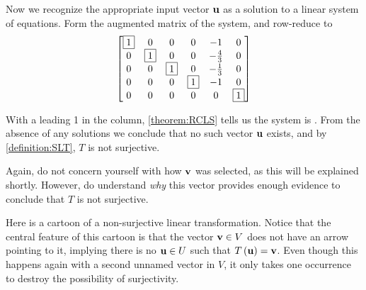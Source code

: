 \documentclass{ximera}
\begin{document}
\begin{example}
Now we recognize the appropriate input vector $\mathbf{u}$ as a solution to a linear system of equations.  Form the augmented matrix of the system, and row-reduce to
\[
\begin{bmatrix}
\fbox{1} & 0 & 0 & 0 & -1 & 0\\
0 & \fbox{1} & 0 & 0 & -\frac{4}{3} & 0\\
0 & 0 & \fbox{1} & 0 & -\frac{1}{3} & 0\\
0 & 0 & 0 & \fbox{1} & -1 & 0\\
0 & 0 & 0 & 0 & 0 & \fbox{1}\\
\end{bmatrix}
\]


With a leading 1 in the  column, \ref{theorem:RCLS} tells us the system is .  From the absence of any solutions we conclude that no such vector $\mathbf{u}$ exists, and by \ref{definition:SLT}, $T$ is not surjective.

Again, do not concern yourself with how $\mathbf{v}$ was selected, as this will be explained shortly.  However, do understand \textit{why} this vector provides enough evidence to conclude that $T$ is not surjective.

\end{example}

Here is a cartoon of a non-surjective linear transformation.  Notice that the central feature of this cartoon is that the vector $\mathbf{v}\in V$ does not have an arrow pointing to it, implying there is no $\mathbf{u}\in U$ such that $T\left(\mathbf{u}\right)=\mathbf{v}$.  Even though this happens again with a second unnamed vector in $V$, it only takes one occurrence to destroy the possibility of surjectivity.
\begin{image}
\end{image}
\end{document}
